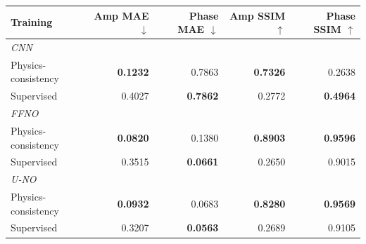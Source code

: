 \begin{tabular}{lrrrr}
\toprule
Training & Amp MAE $\downarrow$ & Phase MAE $\downarrow$ & Amp SSIM $\uparrow$ & Phase SSIM $\uparrow$ \\
\midrule
\multicolumn{5}{l}{\textit{CNN}} \\
\midrule
Physics-consistency & \textbf{0.1232} & 0.7863 & \textbf{0.7326} & 0.2638 \\
Supervised & 0.4027 & \textbf{0.7862} & 0.2772 & \textbf{0.4964} \\
\midrule
\multicolumn{5}{l}{\textit{FFNO}} \\
\midrule
Physics-consistency & \textbf{0.0820} & 0.1380 & \textbf{0.8903} & \textbf{0.9596} \\
Supervised & 0.3515 & \textbf{0.0661} & 0.2650 & 0.9015 \\
\midrule
\multicolumn{5}{l}{\textit{U-NO}} \\
\midrule
Physics-consistency & \textbf{0.0932} & 0.0683 & \textbf{0.8280} & \textbf{0.9569} \\
Supervised & 0.3207 & \textbf{0.0563} & 0.2689 & 0.9105 \\
\bottomrule
\end{tabular}
